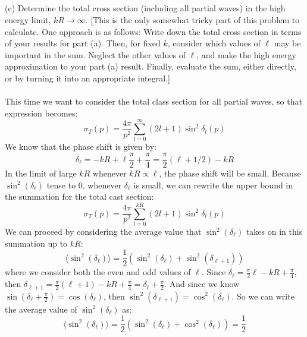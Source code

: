 \documentclass[12pt]{article}
\begin{document}
\subsection{}
(c) Determine the total cross section (including all partial waves) in the high energy limit, $k R \rightarrow \infty$. [This is the only somewhat tricky part of this problem to calculate. One approach is as follows: Write down the total cross section in terms of your results for part (a). Then, for fixed $k$, consider which values of $\ell$ may be important in the sum. Neglect the other values of $\ell$, and make the high energy approximation to your part (a) result. Finally, evaluate the sum, either directly, or by turning it into an appropriate integral.]\\\\
This time we want to consider the total class section for all partial waves, so that expression becomes:
\begin{equation}
\sigma_T(p)=\frac{4 \pi}{p^2} \sum_{l=0}^{
\infty } (2 l+1) \sin ^2 \delta_l(p)
\end{equation}
We know that the phase shift is given by:
\begin{equation}
\delta_{\ell} = -k R+\ell \frac{\pi}{2}+\frac{\pi}{4} =\frac{\pi}{2} (\ell+1/2)-k R
\end{equation}
In the limit of large $kR$ whenever $kR \propto \ell$, the phase shift will be small. Because $\sin^2(\delta_{\ell})$ tense to 0, whenever $\delta_{\ell}$ is small, we can rewrite the upper bound in the summation for the total cast section:
\begin{equation}
\sigma_T(p)=\frac{4 \pi}{p^2} \sum_{l=0}^{kR} (2 l+1) \sin ^2 \delta_l(p)
\end{equation}
We can proceed by considering the average value that $\sin^2(\delta_{\ell})$ takes on in this summation up to $kR$:
\begin{equation}
\langle \sin^2(\delta_{\ell}) \rangle = \frac{1}{2} \left( \sin^2(\delta_{\ell}) + \sin^2(\delta_{\ell+1}) \right)
\end{equation}
where we consider both the even and odd values of $\ell$. Since $\delta_{\ell} = \frac{\pi}{2}\ell - kR + \frac{\pi}{4}$, then $\delta_{\ell+1} = \frac{\pi}{2}(\ell+1) - kR + \frac{\pi}{4} = \delta_{\ell} + \frac{\pi}{2}$. And since we know $\sin{(\delta_{\ell} + \frac{\pi}{2})} = \cos{(\delta_{\ell})}$, then $\sin^2(\delta_{\ell+1}) = \cos^2(\delta_{\ell})$. So we can write the average value of $\sin^2(\delta_{\ell})$ as:
\begin{equation}
\langle \sin^2(\delta_{\ell}) \rangle = \frac{1}{2} \left( \sin^2(\delta_{\ell}) + \cos^2(\delta_{\ell}) \right) = \frac{1}{2}
\end{equation}
\end{document}
